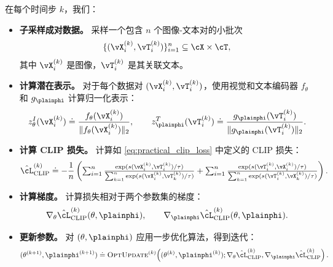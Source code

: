 \documentclass[../../book-main_zh.tex]{subfiles}
\begin{document}
在每个时间步 \(k\)，我们：
\begin{itemize}
    \item \textbf{子采样成对数据。} 采样一个包含 \(n\) 个图像-文本对的小批次
    \[
        \{(\vX_i^{(k)}, \vT_i^{(k)})\}_{i=1}^{n} \subseteq \cX \times \cT,
    \]
    其中 \(\vX_i^{(k)}\) 是图像，\(\vT_i^{(k)}\) 是其关联文本。

    \item \textbf{计算潜在表示。} 对于每个数据对 \((\vX_i^{(k)}, \vT_i^{(k)})\)，使用视觉和文本编码器 \(f_{\theta}\) 和 \(g_{\plainphi}\) 计算归一化表示：
    \begin{equation}
        z_{\theta}^{I}(\vX_i^{(k)}) \doteq \frac{f_{\theta}(\vX_i^{(k)})}{\|f_{\theta}(\vX_i^{(k)})\|_2},
        \qquad
        z_{\plainphi}^{T}(\vT_i^{(k)}) \doteq \frac{g_{\plainphi}(\vT_i^{(k)})}{\|g_{\plainphi}(\vT_i^{(k)})\|_2}.
    \end{equation}

    \item \textbf{计算 CLIP 损失。} 计算如 \eqref{eq:practical_clip_loss} 中定义的 CLIP 损失：
    \begin{equation}
        \hat{\cL}_{\text{CLIP}}^{(k)}
        \doteq
        -\frac{1}{n}\left(    
        \textstyle
        \sum_{i=1}^{n}
        \frac{\exp(s(\vX_i^{(k)},\vT_i^{(k)})/\tau)}{\sum_{k=1}^{n}\exp(s(\vX_i^{(k)},\vT_k^{(k)})/\tau)}
        +
        \sum_{i=1}^{n}
        \frac{\exp(s(\vT_i^{(k)},\vX_i^{(k)})/\tau)}{\sum_{k=1}^{n}\exp(s(\vT_i^{(k)},\vX_k^{(k)})/\tau)}
        \right).
    \end{equation}

    \item \textbf{计算梯度。} 计算损失相对于两个参数集的梯度：
    \begin{equation}
        \nabla_{\theta}\hat{\cL}_{\text{CLIP}}^{(k)}(\theta,\plainphi),
        \qquad
        \nabla_{\plainphi}\hat{\cL}_{\text{CLIP}}^{(k)}(\theta,\plainphi).
    \end{equation}

    \item \textbf{更新参数。} 对 \((\theta,\plainphi)\) 应用一步优化算法，得到迭代：
    \begin{equation}
        (\theta^{(k+1)}, \plainphi^{(k+1)})
        \doteq
        \textsc{OptUpdate}^{(k)}\!\left(
        (\theta^{(k)}, \plainphi^{(k)});
        \nabla_{\theta}\hat{\cL}_{\text{CLIP}}^{(k)},
        \nabla_{\plainphi}\hat{\cL}_{\text{CLIP}}^{(k)}
        \right).
    \end{equation}
\end{itemize}
\end{document}
